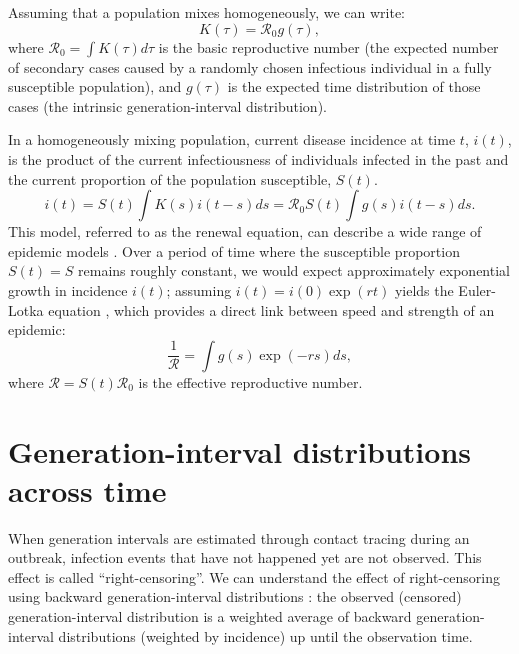 \documentclass[12pt]{article}
\newcommand{\RR}{\ensuremath{{\mathcal R}}}
\begin{document}
Assuming that a population mixes homogeneously, we can write: 
\begin{equation}
K(\tau) = \RR_0 g(\tau),
\end{equation}
where $\RR_0 = \int K(\tau) d\tau$ is the basic reproductive number (the expected number of secondary cases caused by a randomly chosen infectious individual in a fully susceptible population), 
and $g(\tau)$ is the expected time distribution of those cases (the intrinsic generation-interval distribution).

In a homogeneously mixing population, current disease incidence at time $t$, $i(t)$, is the product of the current infectiousness of individuals infected in the past and the current proportion of the population susceptible, $S(t)$.
\begin{equation}
i(t) = S(t) \int K(s) i(t-s) ds = \RR_0 S(t) \int g(s) i(t-s) ds.
\end{equation}
This model, referred to as the renewal equation, can describe a wide range of epidemic models \citep{heesterbeek1996concept, diekmann2000mathematical, roberts2004modelling, aldis2005integral, wallinga2007generation, roberts2007model, Champredon2018equivalence}.
Over a period of time where the susceptible proportion $S(t) = S$ remains roughly constant, we would expect approximately exponential growth in incidence $i(t)$; assuming $i(t) = i(0) \exp(r t)$ yields the Euler-Lotka equation \citep{lotka1907relation}, which provides a direct link between speed and strength of an epidemic:
\begin{equation}
\frac{1}{\RR} = \int g(s) \exp(-r s) ds,
\end{equation}
where $\RR = S(t) \RR_0$ is the effective reproductive number.

\section{Generation-interval distributions across time}

When generation intervals are estimated through contact tracing during an outbreak, infection events that have not happened yet are not observed. 
This effect is called ``right-censoring''.
We can understand the effect of right-censoring using backward generation-interval distributions \citep{tomba2010some, nishiura2010time, champredon2015intrinsic, britton2019estimation}:
the observed (censored) generation-interval distribution is a weighted average of backward generation-interval distributions (weighted by incidence) up until the observation time.
\end{document}
